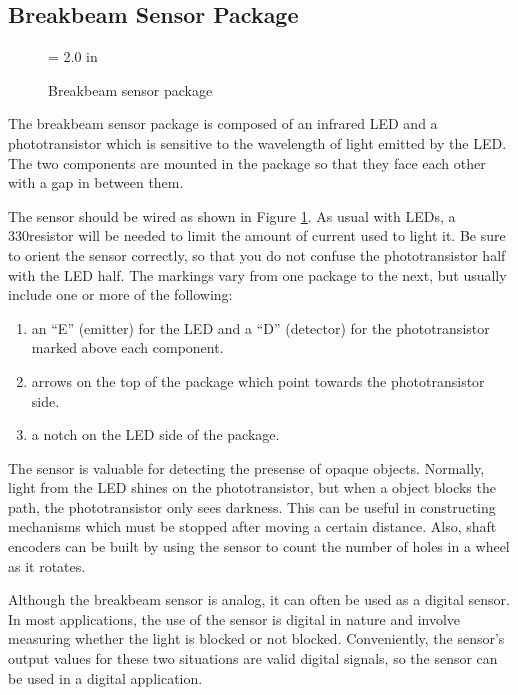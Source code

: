 \subsection{Breakbeam Sensor Package}

\begin{figure}[htbp]
\begin{center}
\epsfysize = 2.0 in
 \caption{Breakbeam sensor package}
 \label{break}
\end{center}
\end{figure}

The breakbeam sensor package is composed of an infrared LED and a phototransistor which is sensitive to the wavelength of light emitted by the LED. The two components are mounted in the package so that they face each other with a gap in between them. 

The sensor should be wired as shown in Figure \ref{break}. As usual with LEDs, a 330\ohm resistor will be needed to limit the amount of current used to light it. Be sure to orient the sensor correctly, so that you do not confuse the phototransistor half with the LED half. The markings vary from one package to the next, but usually include one or more of the following:

\begin{enumerate}
\item an ``E'' (emitter) for the LED and a ``D'' (detector) for the phototransistor marked above each component.
\item arrows on the top of the package which point towards the phototransistor side.
\item a notch on the LED side of the package.
\end{enumerate}

The sensor is valuable for detecting the presense of opaque objects. Normally, light from the LED shines on the phototransistor, but when a object blocks the path, the phototransistor only sees darkness. This can be useful in constructing mechanisms which must be stopped after moving a certain distance. Also, shaft encoders can be built by using the sensor to count the number of holes in a wheel as it rotates.

Although the breakbeam sensor is analog, it can often be used as a digital sensor. In most applications, the use of the sensor is digital in nature and involve measuring whether the light is blocked or not blocked. Conveniently, the sensor's output values for these two situations are valid digital signals, so the sensor can be used in a digital application.
